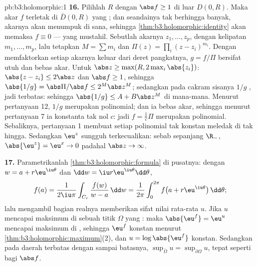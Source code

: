 \begin{solution}{pb:b3:holomorphic:1}
\textbf{16.} Pilihlah $R$ dengan $\abs f \geq 1$ di luar
$D(0, R)$. Maka akar $f$ terletak di $\bar D(0, R)$ yang
; dan seandainya tak berhingga banyak, akarnya akan menumpuk
di sana, sehingga \cref{thm:b3:holomorphic:identity} akan memaksa $f
\equiv 0$ --- yang mustahil. Sebutlah akarnya $z_1, \dots, z_p$, dengan
kelipatan $m_1, \dots, m_p$, lalu tetapkan $M = \sum m_i$ dan
$\Pi(z) = \prod_i(z - z_i)^{m_i}$. Dengan memfaktorkan setiap akarnya keluar
dari deret pangkatnya, $g = f/\Pi$ bersifat utuh dan bebas akar.
Untuk $\abs z \geq \max(R, 2\max_i\abs{z_i})$: $\abs{z - z_i}
\leq 2\abs z$ dan $\abs f \geq 1$, sehingga $\abs{1/g} =
\abs\Pi/\abs f \leq 2^M\abs z^M$; sedangkan pada cakram 
sisanya $1/g$ , jadi terbatas: sehingga $\abs{1/g} \leq A +
B\abs z^M$ di mana-mana. Menurut pertanyaan 12, $1/g$ merupakan
polinomial; dan ia bebas akar, sehingga menurut pertanyaan 7 ia
konstanta tak nol $c$: jadi $f = \frac1c\Pi$ merupakan polinomial.
Sebaliknya, pertanyaan 1 membuat setiap polinomial tak konstan
meledak di tak hingga. Sedangkan $\eu^z$ sungguh terkecualikan: sebab sepanjang $\R_-$,
$\abs{\eu^z} = \eu^x \to 0$ padahal $\abs z \to \infty$.

\textbf{17.} Parametrikanlah \cref{thm:b3:holomorphic:formula}
di pusatnya: dengan $w = a + r\eu^{\iu\theta}$ dan $\dd w = \iu
r\eu^{\iu\theta}\dd\theta$,
\[
f(a) = \frac1{2\iu\pi}\int_{C_r}\frac{f(w)}{w - a}\,\dd w
= \frac1{2\pi}\int_0^{2\pi}
f\bigl(a + r\eu^{\iu\theta}\bigr)\,\dd\theta ;
\]
lalu mengambil bagian realnya memberikan sifat nilai rata-rata $u$. Jika
$u$ mencapai maksimum di sebuah titik  $\Omega$ yang
: maka $\abs{\eu^f} = \eu^u$ mencapai maksimum di ,
sehingga $\eu^f$ konstan menurut
\cref{thm:b3:holomorphic:maximum}(2), dan $u =
\log\abs{\eu^f}$ konstan. Sedangkan pada daerah terbatas dengan
 sampai batasnya, $\sup_{\bar\Omega}u =
\sup_{\partial\Omega}u$, tepat seperti bagi $\abs f$.


\end{solution}
